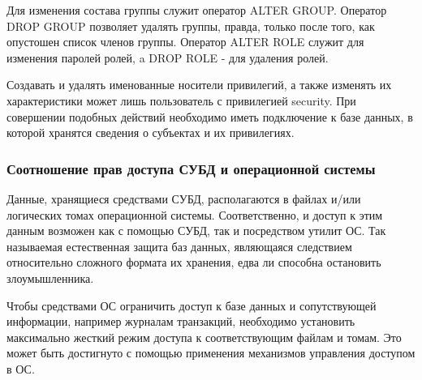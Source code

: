 Для изменения состава группы служит оператор ALTER GROUP. Оператор DROP GROUP позволяет удалять
группы, правда, только после того, как опустошен список членов группы. Оператор ALTER ROLE служит
для изменения паролей ролей, a DROP ROLE - для удаления ролей.

Создавать и удалять именованные носители привилегий, а также изменять их характеристики может лишь
пользователь с привилегией security. При совершении подобных действий необходимо иметь подключение
к базе данных, в которой хранятся сведения о субъектах и их привилегиях.


\subsubsection{Соотношение прав доступа СУБД и операционной системы}

Данные, хранящиеся средствами СУБД, располагаются в файлах и/или логических томах операционной
системы. Соответственно, и доступ к этим данным возможен как с помощью СУБД, так и посредством
утилит ОС. Так называемая естественная защита баз данных, являющаяся следствием относительно
сложного формата их хранения, едва ли способна остановить злоумышленника.

Чтобы средствами ОС ограничить доступ к базе данных и сопутствующей информации,
например журналам транзакций, необходимо установить максимально жесткий режим доступа к
соответствующим файлам и томам. Это может быть достигнуто с помощью применения механизмов
управления доступом в ОС.


